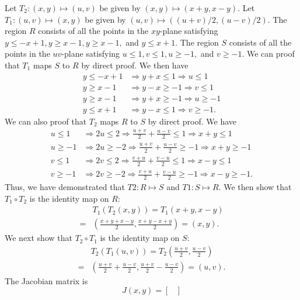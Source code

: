 \documentclass[8pt,twocolumn]{article}
\begin{document}
\begin{Answer}[number=22]
  Let $T_2:(x,y)\mapsto (u,v)$ be given by $(x,y)\mapsto(x+y, x-y)$.
  Let $T_1:(u,v)\mapsto (x,y)$ be given by $(u,v)\mapsto((u+v)/2, (u-v)/2)$.
  The region $R$ consists of all the points in the $xy$-plane satisfying $y\le
  -x+1, y\ge x-1, y\ge x-1,$ and $y\le x+1$.
  The region $S$ consists of all the points in the $uv$-plane satisfying $u\le
  1, v\le 1, u\ge -1,$ and $v\ge -1$.
  We can proof that $T_1$ maps $S$ to $R$ by direct proof. We then have
  \begin{align*}
    y\le -x+1 & \Rightarrow y+x \le 1  \Rightarrow u \le 1   \\
    y\ge x-1  & \Rightarrow y-x \ge -1 \Rightarrow v \le 1   \\
    y\ge x-1  & \Rightarrow y+x \ge -1 \Rightarrow u \ge -1  \\
    y\le x+1  & \Rightarrow y-x \le 1  \Rightarrow v \ge -1.
  \end{align*}
  We can also proof that $T_2$ maps $R$ to $S$ by direct proof. We have
  \begin{align*}
    u \le 1  & \Rightarrow 2u \le 2  \Rightarrow \frac{u+v}{2} + \frac{u-v}{2} \le 1
    \Rightarrow x+y \le 1\\
    u \ge -1 & \Rightarrow 2u \ge -2 \Rightarrow \frac{u+v}{2} + \frac{u-v}{2} \ge -1
    \Rightarrow x+y \ge -1\\
    v \le 1  & \Rightarrow 2v \le 2  \Rightarrow \frac{v+u}{2} + \frac{v-u}{2} \le 1
    \Rightarrow x-y \le 1\\
    v \ge -1 & \Rightarrow 2v \ge -2 \Rightarrow \frac{v+u}{2} + \frac{v-u}{2} \ge -1
    \Rightarrow x-y \ge -1.
  \end{align*}
  Thus, we have demonstrated that $T2: R\mapsto S$ and $T1: S\mapsto R$. We
  then show that $T_1 \circ T_2$ is the identity map on $R$:
  \begin{align*}
    &T_1(T_2(x,y)) = T_1(x+y, x-y) \\= &(\frac{x+y+x-y}{2}, \frac{x+y-x+y}{2}) =
    (x,y).
  \end{align*}
  We next show that $T_2 \circ T_1$ is the identity map on $S$:
  \begin{align*}
    &T_2(T_1(u,v)) = T_2(\frac{u+v}{2}, \frac{u-v}{2}) \\ =
    &(\frac{u+v}{2}+\frac{u-v}{2}, \frac{u+v}{2}-\frac{u-v}{2})=
    (u,v).
  \end{align*}
  The Jacobian matrix is
  \[
    J(x,y)={\begin{bmatrix}

\end{bmatrix}}\]
\end{Answer}
\end{document}

